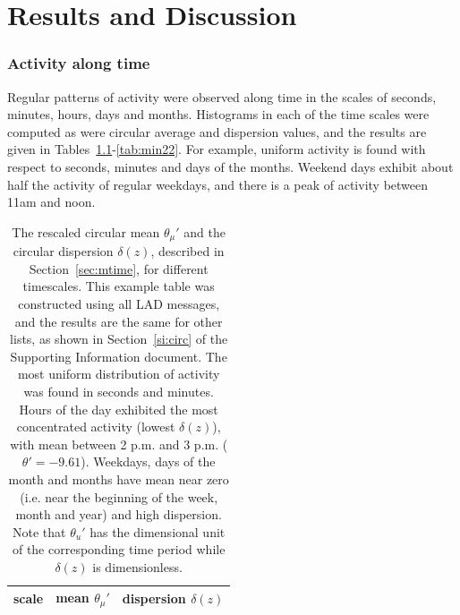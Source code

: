 \chapter{Results and Discussion}
\label{ch:disc}
\subsection{Activity along time}\label{constDisc}
Regular patterns of activity were observed along time
in the scales of seconds, minutes, hours, days and months.
Histograms in each of the time scales were computed as were circular average and dispersion values, and the results are given in Tables~\ref{tab:circ}-\ref{tab:min22}. For example, uniform activity is found with respect to seconds, minutes and days of the months. Weekend days exhibit about half the activity of regular weekdays, and there is a peak of activity between 11am and noon.


\begin{table}
\caption{The rescaled circular mean $\theta_\mu'$ and the circular dispersion $\delta(z)$, described in Section~\ref{sec:mtime}, for different timescales. This example table was constructed using all LAD messages, and the results are the same for other lists, as shown in Section~\ref*{si:circ} of the Supporting Information document. The most uniform distribution of activity was found in seconds and minutes. 	Hours of the day exhibited the most concentrated activity (lowest $\delta(z)$), with mean between 2 p.m. and 3 p.m. ($\theta'=-9.61$). Weekdays, days of the month and months have mean near zero (i.e. near the beginning of the week, month and year) and high dispersion. Note that $\theta_u'$ has the dimensional unit of the corresponding time period while $\delta(z)$ is dimensionless.}
\begin{center}
\begin{tabular}{ |l|| c|c| }
\hline
scale & mean $\theta_\mu'$ & dispersion $\delta(z)$  \\ \hline

\end{tabular}
\end{center}
\label{tab:circ}
\end{table}


